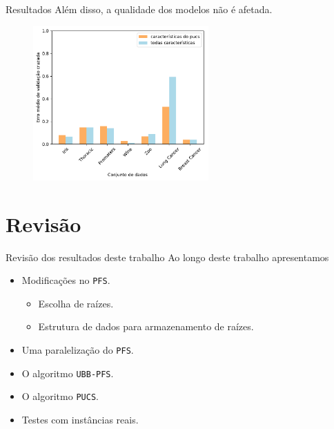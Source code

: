 \documentclass{beamer}
\newcommand{\algname}[1]{\texttt{#1}}
\begin{document}
\begin{frame}{Resultados}
    Além disso, a qualidade dos modelos não é afetada. \pause
    \begin{figure}
        \includegraphics[clip=true, width=0.6\textwidth]{uci/svm_error.pdf}
    \end{figure}
\end{frame}

\section{Revisão}
\begin{frame}{Revisão dos resultados deste trabalho}
Ao longo deste trabalho apresentamos \pause
    \begin{itemize}
        \item{Modificações no \algname{PFS}.}
        \begin{itemize}
            \item{Escolha de raízes.}
            \item{Estrutura de dados para armazenamento de raízes.}
        \end{itemize} \pause
        \item{Uma paralelização do \algname{PFS}.} \pause
        \item{O algoritmo \algname{UBB-PFS}.} \pause
        \item{O algoritmo \algname{PUCS}.} \pause
        \item{Testes com instâncias reais.} \pause
    \end{itemize}
\end{frame}
\end{document}
